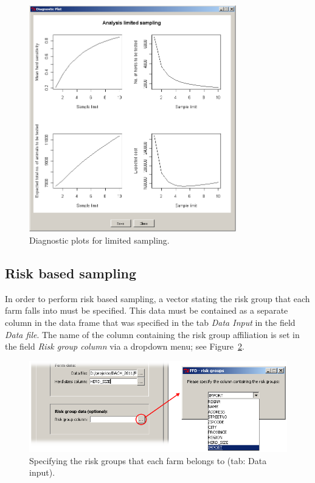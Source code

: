 \documentclass[nojss]{jss}
\begin{document}
\begin{figure}[h!t]
\begin{center}
\includegraphics[width=90mm]{GUI_diag_ltd2.png}
\end{center}
\caption{Diagnostic plots for limited sampling.} \label{fig:GUI_diag_ltd2}
\end{figure}


\subsection{Risk based sampling}
\label{subsec:GUI_riskBased}

In order to perform risk based sampling, a vector stating the risk group that each farm falls into must be specified. This data must be contained as a separate column in the data frame that was specified in the tab \emph{Data Input}  in the field  \emph{Data file}. The name of the column containing the risk group affiliation is set in the field  \emph{Risk group column} via a dropdown menu; see Figure~\ref{fig:GUI_Risk_Group}.

\begin{figure}[h!t]
\begin{center}
\includegraphics[width=125mm]{GUI_Risk_Group.png}
\end{center}
\caption{Specifying the risk groups that each farm belongs to (tab: Data input).}
\label{fig:GUI_Risk_Group} \end{figure}
\end{document}
